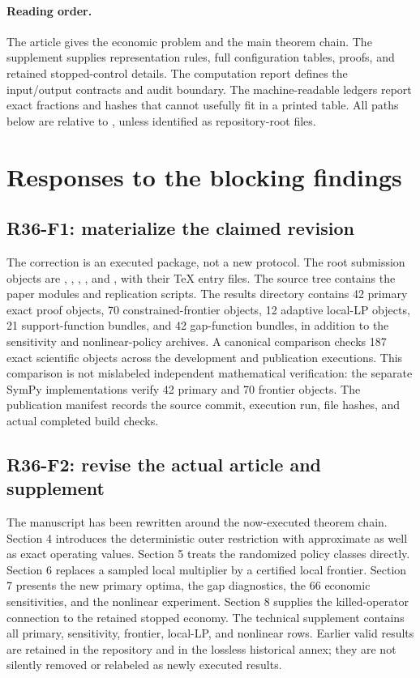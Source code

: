 \paragraph{Reading order.} The article gives the economic problem and the main theorem chain. The supplement supplies representation rules, full configuration tables, proofs, and retained stopped-control details. The computation report defines the input/output contracts and audit boundary. The machine-readable ledgers report exact fractions and hashes that cannot usefully fit in a printed table. All paths below are relative to , unless identified as repository-root files.

\section{Responses to the blocking findings}
\subsection{R36-F1: materialize the claimed revision}
The correction is an executed package, not a new protocol. The root submission objects are , , , , and , with their TeX entry files. The source tree contains the paper modules and replication scripts. The results directory contains 42 primary exact proof objects, 70 constrained-frontier objects, 12 adaptive local-LP objects, 21 support-function bundles, and 42 gap-function bundles, in addition to the sensitivity and nonlinear-policy archives. A canonical comparison checks 187 exact scientific objects across the development and publication executions. This comparison is not mislabeled independent mathematical verification: the separate SymPy implementations verify 42 primary and 70 frontier objects. The publication manifest records the source commit, execution run, file hashes, and actual completed build checks.

\subsection{R36-F2: revise the actual article and supplement}
The manuscript has been rewritten around the now-executed theorem chain. Section 4 introduces the deterministic outer restriction with approximate as well as exact operating values. Section 5 treats the randomized policy classes directly. Section 6 replaces a sampled local multiplier by a certified local frontier. Section 7 presents the new primary optima, the gap diagnostics, the 66 economic sensitivities, and the nonlinear experiment. Section 8 supplies the killed-operator connection to the retained stopped economy. The technical supplement contains all primary, sensitivity, frontier, local-LP, and nonlinear rows. Earlier valid results are retained in the repository and in the lossless historical annex; they are not silently removed or relabeled as newly executed results.


